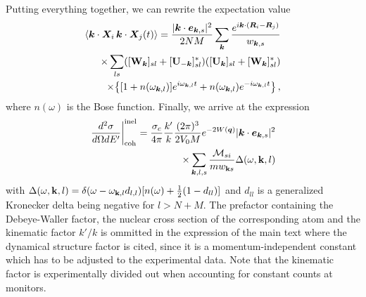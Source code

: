 \documentclass[aps,prl,twocolumn,superscriptaddress,amsmath,amssymb,floats,aps,10pt]{revtex4-1}
\begin{document}
Putting everything together, we can rewrite the expectation value
\begin{align}
 \langle \bm k\cdot\bm X_i\,\bm k\cdot\bm X_j(t)\rangle=\frac{|\bm k\cdot \bm e_{\bm k,s}|^2}{2NM}\sum_{\bm k}\frac{e^{i\bm k\cdot(\bm R_i-\bm R_j)}}{w_{\bm k,s}}\notag\\
 \times \sum_{ls}([\mathbf W_{\bm k}]_{sl}+[\mathbf U_{-\bm k}]^*_{sl})([\mathbf U_{\bm k}]_{sl}+[\mathbf W_{\bm k}]_{sl}^*)\notag\\
 \times\bigl\{[1+n(\omega_{\bm k,l})] e^{i\omega_{\bm k,l}t} +n(\omega_{\bm k,l}) e^{-i\omega_{\bm k,l}t}\bigr\}\,,
\end{align}
where $n(\omega)$ is the Bose function.
Finally, we arrive at the expression
\begin{align}
  \left.\frac{d^2 \sigma}{d \Omega dE'}\right|_{\text{coh}}^{\text{inel}}=\frac{\sigma_c}{4\pi}\frac{k'}{k} \frac{(2\pi)^3}{2V_0M} e^{-2W(\bm q)} |\bm k\cdot\bm e_{\bm k,s}|^2\notag\\
  \times \sum_{\bm k,l,s}\frac{\mathcal M_{si}}{mw_{{\bf k}s}} \Delta(\omega,{\bf k},l)\label{eq_nuc_structure}
\end{align}
with
$\Delta(\omega,{\bf k},l)= \delta(\omega- \omega_{{\bf k},l}d_{l,l})[n(\omega) +\frac 12 (1-d_{ll})]$ and $d_{ll}$ is a generalized Kronecker delta being negative for $l>N+M$.
The prefactor containing the Debeye-Waller factor, the nuclear cross section of the corresponding atom and the kinematic factor $k'/k$ is ommitted in the expression of the main text where
the dynamical structure factor is cited, since it is a momentum-independent constant which has to be adjusted to the experimental data.
Note that the kinematic factor is experimentally divided out when accounting for
constant counts at monitors.
\end{document}
